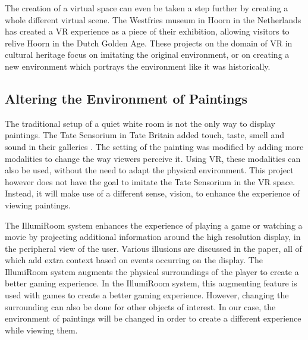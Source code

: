 \documentclass[a4paper]{article}
\begin{document}
The creation of a virtual space can even be taken a step further by creating a whole different virtual scene. The Westfries museum in Hoorn in the Netherlands has created a VR experience \cite{westfries} as a piece of their exhibition, allowing visitors to relive Hoorn in the Dutch Golden Age.
These projects on the domain of VR in cultural heritage focus on imitating the original environment, or on creating a new environment which portrays the environment like it was historically.


\subsection{Altering the Environment of Paintings}


The traditional setup of a quiet white room is not the only way to display paintings. The Tate Sensorium \cite{tate1} in Tate Britain added touch, taste, smell and sound in their galleries \cite{tate2}. The setting of the painting was modified by adding more modalities to change the way viewers perceive it. Using VR, these modalities can also be used, without the need to adapt the physical environment. This project however does not have the goal to imitate the Tate Sensorium in the VR space. Instead, it will make use of a different sense, vision, to enhance the experience of viewing paintings.

The IllumiRoom system \cite{illumiroom} enhances the experience of playing a game or watching a movie by projecting additional information around the high resolution display, in the peripheral view of the user. Various illusions are discussed in the paper, all of which add extra context based on events occurring on the display. The IllumiRoom system augments the physical surroundings of the player to create a better gaming experience. In the IllumiRoom system, this augmenting feature is used with games to create a better gaming experience. However, changing the surrounding can also be done for other objects of interest. In our case, the environment of paintings will be changed in order to create a different experience while viewing them.

\end{document}
